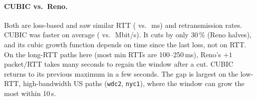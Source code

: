 \documentclass[11pt]{article}
\begin{document}
\paragraph{CUBIC vs.\ Reno.}
Both are loss-based and saw similar RTT ( vs.\ \,ms) and
retransmission rates. CUBIC was faster on average ( vs.\
\,Mbit/s). It cuts by only 30\,\% (Reno halves), and its cubic growth
function depends on time since the last loss, not on RTT. On the long-RTT paths here (most min RTTs
are 100--250\,ms), Reno's $+1$ packet/RTT takes many seconds to regain the window after a cut. CUBIC
returns to its previous maximum in a few seconds. The gap is largest on the low-RTT, high-bandwidth
US paths (\texttt{wdc2}, \texttt{nyc1}), where the window can grow the most within 10\,s.
\end{document}
